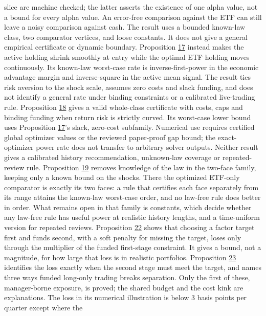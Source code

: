\documentclass[11pt]{article}
\begin{document}
slice are machine checked; the latter asserts the existence of
one alpha value, not a bound for every alpha value. An error-free comparison
against the ETF can still leave a noisy comparison against cash.
The result uses a bounded known-law class, two comparator
vertices, and loose constants. It does not give a general
empirical certificate or dynamic boundary.
Proposition \hyperref[res:Proposition-17]{17} instead makes the active holding shrink smoothly
at entry while the optimal ETF holding moves continuously. Its
known-law worst-case rate is inverse-first-power in the economic
advantage margin and inverse-square in the active mean signal.
The result ties risk aversion to the shock scale, assumes zero
costs and slack funding, and does not identify a general rate
under binding constraints or a calibrated live-trading rule.
Proposition \hyperref[res:Proposition-18]{18} gives a valid whole-class certificate with
costs, caps and binding funding when return risk is strictly
curved. Its worst-case lower bound uses Proposition \hyperref[res:Proposition-17]{17}'s slack,
zero-cost subfamily. Numerical use requires certified global
optimizer values or the reviewed paper-proof gap bound; the
exact-optimizer power rate does not transfer to arbitrary
solver outputs. Neither result gives a calibrated history
recommendation, unknown-law coverage or repeated-review rule.
Proposition \hyperref[res:Proposition-19]{19} removes knowledge of the law in the two-face
family, keeping only a known bound on the shocks. There the
optimized ETF-only comparator is exactly its two faces: a rule
that certifies each face separately from its range attains the
known-law worst-case order, and no law-free rule does better in
order. What remains open in that family is constants, which
decide whether any law-free rule has useful power at realistic
history lengths, and a time-uniform version for repeated
reviews.
Proposition \hyperref[res:Proposition-22]{22} shows that choosing a factor target first and funds
second, with a soft penalty for missing the target, loses only
through the multiplier of the funded first-stage constraint. It
gives a bound, not a magnitude, for how large that loss is in
realistic portfolios. Proposition \hyperref[res:Proposition-23]{23} identifies the loss exactly
when the second stage must meet the target, and names three ways
funded long-only trading breaks separation. Only the first of
these, manager-borne exposure, is proved; the shared budget and
the cost kink are explanations. The loss in its numerical
illustration is below 3 basis points per quarter except where the
\end{document}
